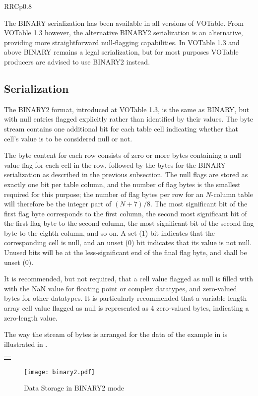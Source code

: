 \begin{tabular}{RRCp{0.8\textwidth}}
\begin{center}
{The BINARY serialization has been available in all versions of VOTable.
From VOTable 1.3 however, the alternative BINARY2 serialization is
an alternative, providing more straightforward null-flagging capabilities.
In VOTable 1.3 and above BINARY remains a legal serialization, but for most
purposes VOTable producers are advised to use BINARY2 instead.

\subsection{\texorpdfstring{ Serialization}
                           {BINARY2 Serialization}}
\label{sec:BIN2}

The BINARY2 format, introduced at VOTable 1.3, is the same as BINARY,
but with null entries flagged explicitly rather than identified
by their values.
The byte stream contains one additional bit for each table cell
indicating whether that cell's value is to be considered null or not.

The byte content for each row consists of
zero or more bytes containing a null value flag for each cell in the row,
followed by the bytes for the BINARY serialization as described in the
previous subsection.
The null flags are stored as exactly one bit per table column, and the number
of flag bytes is the smallest required for this purpose;
the number of flag bytes per row for an $N$-column table will therefore
be the integer part of  $(N+7)/8$.
The most significant bit of the first flag byte corresponds to the
first column,
the second most significant bit of the first flag byte to the second column,
the most significant bit of the second flag byte to the eighth column,
and so on.  A set (1) bit indicates that the corresponding cell is null,
and an unset (0) bit indicates that its value is not null.
Unused bits will be at the less-significant end of the final flag byte,
and shall be unset (0).

It is recommended, but not required, that a cell value flagged as null
is filled with with the NaN value for floating point or complex datatypes,
and zero-valued bytes for other datatypes.
It is particularly recommended that a variable length array cell value
flagged as null is represented as 4 zero-valued bytes, indicating
a zero-length value.

The way the stream of bytes is arranged for the data of the
example in  is illustrated in
.

\label{Image3}
\ifhtx\begin{tabular}{c}
\tag{IMG SRC="binary2.png" NAME="Image3" ALIGN=LEFT BORDER=0}\end{tabular}
\else\begin{center}
\begin{figure}[htb]
\texttt{[image: binary2.pdf]}
\caption{\label{fig:bin2}Data Storage in BINARY2 mode}
\end{figure}\end{center}
\fi

}
\end{center}
\end{tabular}
